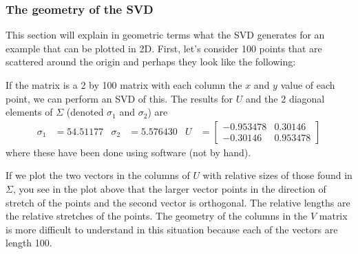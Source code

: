 \subsubsection{The geometry of the SVD} 

This section will explain in geometric terms what the SVD generates for an example that can be plotted in 2D.  First, let's consider 100 points that are scattered around the origin and perhaps they look like the following:

\begin{center}

\end{center}

If the matrix is a 2 by 100 matrix with each column the $x$ and $y$ value of each point, we can perform an SVD of this.  The results for $U$ and the 2 diagonal elements of $\Sigma$ (denoted $\sigma_1$ and $\sigma_2$) are
\begin{align*}
\sigma_1 & = 54.51177 & \sigma_2 & =  
5.576430 & U & = \begin{bmatrix}
-0.953478 & 0.30146\\
-0.30146 & 0.953478 
\end{bmatrix}
\end{align*}
where these have been done using software (not by hand).  

If we plot the two vectors in the columns of $U$ with relative sizes of those found in $\Sigma$, you see in the plot above that the larger vector points in the direction of stretch of the points and the second vector is orthogonal.  The relative lengths are the relative stretches of the points.   The geometry of the columns in the $V$ matrix is more difficult to understand in this situation because each of the vectors are length 100. 

